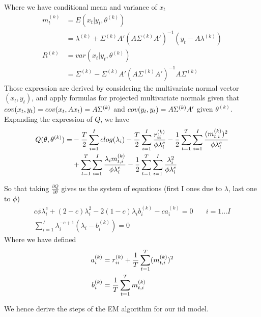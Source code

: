\documentclass[twoside]{article}
\begin{document}
Where we have conditional mean and variance of $x_t$
\begin{align*}
m_t^{(k)} & = E\left(x_t | y_t, \theta^{(k)}\right)\\
& = \lambda^{(k)} + \Sigma^{(k)} A' (A \Sigma^{(k)} A' )^{-1} \left(y_t - A \lambda^{(k)}\right)\\
R^{(k)} & = var\left(x_t | y_t, \theta^{(k)}\right)\\
& = \Sigma^{(k)} - \Sigma^{(k)} A' (A \Sigma^{(k)} A' )^{-1} A \Sigma^{(k)}
\end{align*}
Those expression are derived by considering the multivariate normal vector $(x_t, y_t)$, and apply formulas for projected multivariate normals given that $cov(x_t, y_t) = cov(x_t, A x_t) = A \* \Sigma^{(k)}$ and $cov(y_t, y_t) = A \* \Sigma^{(k)} \* A'$ given $\theta^{(k)}$.\\

Expanding the expression of $Q$, we have
\begin{align*}
Q(\theta, \theta^{(k)}) = & - \frac{T}{2} \sum_{i = 1}^I c \* log(\lambda_i) - \frac{T}{2} \sum_{i = 1}^{I} \frac{r_{i i}^{(k)}}{\phi \* \lambda_i^{c}} - \frac{1}{2} \* \sum_{t=1}^{T} \sum_{i=1}^I \frac{(m_{t, i}^{(k)})^2}{\phi \* \lambda_i^c}\\
& + \sum_{t=1}^T \sum_{i=1}^I \frac{\lambda_i \* m_{t, i}^{(k)}}{\phi \* \lambda_i^c} - \frac{1}{2} \* \sum_{t=1}^T \sum_{i=1}^I \frac{\lambda_i^2}{\phi \* \lambda_i^c}
\end{align*}

So that taking $\frac{\partial Q}{\partial \theta}$ gives us the system of equations (first I ones due to $\lambda$, last one to $\phi$)
\begin{eqnarray}
c \phi \lambda_i^{c} + (2 - c) \lambda_i^2 - 2 ( 1 -c) \lambda_i b_i^{(k)} - c a_i^{(k)} = 0 &  \quad i = 1...I \\
\sum_{i = 1}^I \lambda_i^{-c + 1} ( \lambda_i - b_i^{(k)} )  = 0 &
\end{eqnarray}
Where we have defined
\begin{align*}
a_i^{(k)} & = r_{i i}^{(k)} + \frac{1}{T} \* \sum_{t=1}^T (m_{t, i}^{(k)})^2\\
b_i^{(k)} & = \frac{1}{T} \* \sum_{t=1}^T m_{t, i}^{(k)}
\end{align*}


We hence derive the steps of the EM algorithm for our iid model.\\
\end{document}

